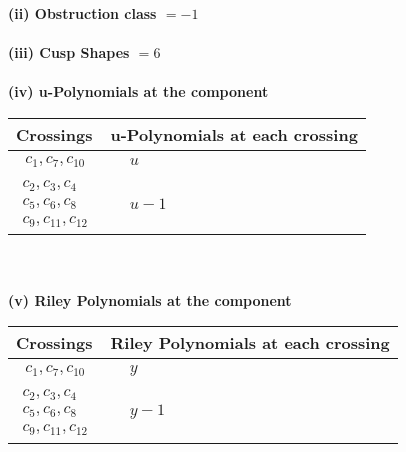 \documentclass[1p]{elsarticle_modified}
\theoremstyle{definition}
\begin{document}
\flushleft \textbf{(ii) Obstruction class $= -1$}\\~\\
\flushleft \textbf{(iii) Cusp Shapes $= 6$}\\~\\
\newpage\renewcommand{\arraystretch}{1}
\flushleft \textbf{(iv) u-Polynomials at the component}\newline \\
\begin{tabular}{m{50pt}|m{274pt}}
Crossings & \hspace{64pt}u-Polynomials at each crossing \\
\hline $$\begin{aligned}c_{1},c_{7},c_{10}\end{aligned}$$&$\begin{aligned}
&u
\end{aligned}$\\
\hline $$\begin{aligned}c_{2},c_{3},c_{4}\\c_{5},c_{6},c_{8}\\c_{9},c_{11},c_{12}\end{aligned}$$&$\begin{aligned}
&u-1
\end{aligned}$\\
\hline
\end{tabular}\\~\\
\newpage\renewcommand{\arraystretch}{1}
\flushleft \textbf{(v) Riley Polynomials at the component}\newline \\
\begin{tabular}{m{50pt}|m{274pt}}
Crossings & \hspace{64pt}Riley Polynomials at each crossing \\
\hline $$\begin{aligned}c_{1},c_{7},c_{10}\end{aligned}$$&$\begin{aligned}
&y
\end{aligned}$\\
\hline $$\begin{aligned}c_{2},c_{3},c_{4}\\c_{5},c_{6},c_{8}\\c_{9},c_{11},c_{12}\end{aligned}$$&$\begin{aligned}
&y-1
\end{aligned}$\\
\hline
\end{tabular}\\~\\
\end{document}
